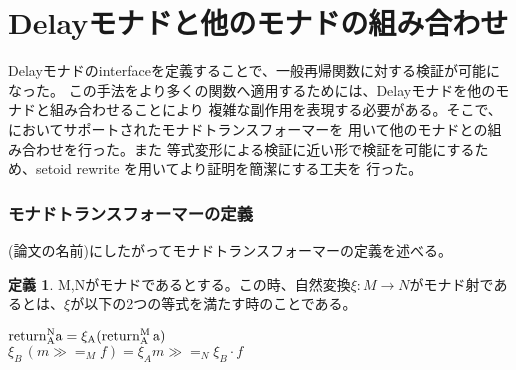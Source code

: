 \documentclass[japanese]{jssst_ppl}
\theoremstyle{definition}
\newtheorem{definition}[theorem]{定義}
\newcommand{\ret}{\rm{return}}
\newcommand{\binds}{ \gg = }
\begin{document}
\iffalse
  \begin{verbatim}
  HB.mixin Record isMonadDelay (M : UU0 -> UU0) of Monad M := {
  while : forall {A B : UU0}, (A -> M(B + A)%type) -> A ->M B;
  wBisim: forall {A : UU0}, M A -> M A -> Prop;
  wBisim_refl: forall A (a: M A), wBisim a a;
  wBisim_sym: forall A (a b: M A), wBisim a b -> wBisim b a;
  wBisim_trans: forall A (a b c: M A), wBisim a b -> wBisim b c -> wBisim a c;
  fixpointE: forall (A B : UU0) (f: A -> M (B + A)%type) (a: A),
  wBisim (while f a) ((f a) >>= (sum_rect (fun => M B ) (@ret M B) (while f)));
  naturalityE: forall (A B C : UU0) (f: A -> M (B + A)%type) (g: B -> M C) (a: A),
  wBisim ((while f a) >>= g)(while (fun y => (f y) >>= (sum_rect (fun => M (C + A)%type) (M # inl \o g) (M # inr \o (@ret M A )) ) ) a);
  codiagonalE:forall (A B : UU0) (f: A -> M ((B + A) + A)%type) (a: A),
  wBisim (while ((M # ((sum_rect (fun => (B + A)%type) idfun inr)))  \o f ) a) (while (while f) a);
  bindmwB: forall (A B: UU0) (f: A -> M B)(d1 d2: M A),
  wBisim d1 d2 -> wBisim (d1 >>= f) (d2>>= f);
  bindfwB: forall (A B: UU0) (f g: A -> M B)(d: M A),
  (forall a, wBisim (f a) (g a)) -> wBisim (d >>= f) (d >>= g);
  whilewB: forall (A B : UU0) (f g: A -> M ((B + A))%type) (a: A),
  (forall a, wBisim (f a) (g a)) -> wBisim (while f a) (while g a);
  }.
        \end{verbatim}

\fi

\section{Delayモナドと他のモナドの組み合わせ}
Delayモナドのinterfaceを定義することで、一般再帰関数に対する検証が可能になった。
この手法をより多くの関数へ適用するためには、Delayモナドを他のモナドと組み合わせることにより
複雑な副作用を表現する必要がある。そこで、\cite{ddd}においてサポートされたモナドトランスフォーマーを
用いて他のモナドとの組み合わせを行った。また
等式変形による検証に近い形で検証を可能にするため、setoid rewrite を用いてより証明を簡潔にする工夫を
行った。


\iffalse
  \subsubsection{モナドトランスフォーマーの定義}
  (論文の名前)にしたがってモナドトランスフォーマーの定義を述べる。


  \begin{definition}
    M,Nがモナドであるとする。この時、自然変換$\xi: M \to N$がモナド射であるとは、$\xi$が以下の2つの等式を満たす時のことである。
    \begin{center}
      $ \ret_A^N a = \xi_A (\ret_A^M \, a)$ \\
      $ \xi_B \,(m \binds_M f) = \xi_A m \binds_N \xi_B \cdot f $ \\
    \end{center}
  \end{definition}
\end{document}
